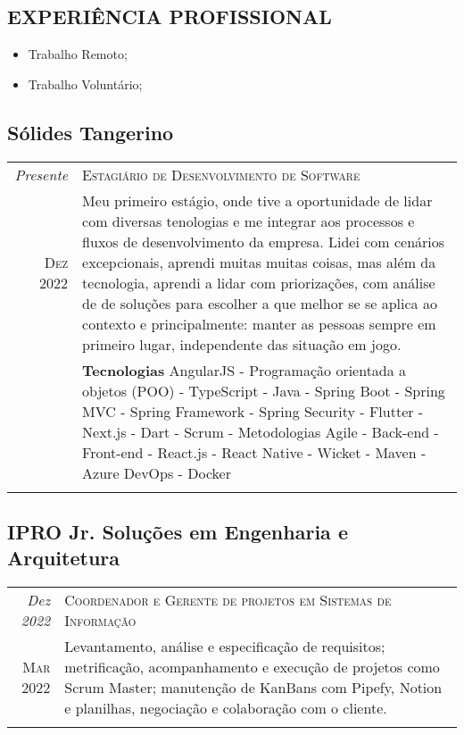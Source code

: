 \begin{framed}
\section{EXPERIÊNCIA PROFISSIONAL}
\begin{itemize}
  \item Trabalho Remoto;
  \item Trabalho Voluntário;

\end{itemize}

\subsection{  Sólides Tangerino}

\begin{tabular}{r|p{6cm}}
\emph{Presente}   & \textsc{Estagiário de Desenvolvimento de Software} \\
\textsc{Dez 2022} & \footnotesize{Meu primeiro estágio, onde tive a oportunidade de lidar com diversas tenologias e me integrar aos processos e fluxos de desenvolvimento da empresa. Lidei com cenários excepcionais, aprendi muitas muitas coisas, mas além da tecnologia, aprendi a lidar com priorizações, com análise de de soluções para escolher a que melhor se se aplica ao contexto e principalmente: manter as pessoas sempre em primeiro lugar, independente das situação em jogo.}\\
  & \footnotesize{
 \textbf{Tecnologias} 
 AngularJS - Programação orientada a objetos (POO) - TypeScript - Java - Spring Boot - Spring MVC - Spring Framework - Spring Security - Flutter - Next.js - Dart - Scrum - Metodologias Agile - Back-end - Front-end - React.js - React Native - Wicket - Maven - Azure DevOps - Docker}\\
\multicolumn{2}{c}{}
\end{tabular}


\subsection{  IPRO Jr. Soluções em Engenharia e Arquitetura}

\begin{tabular}{r|p{6cm}}
\emph{Dez 2022}   & \textsc{Coordenador e Gerente de projetos em Sistemas de Informação }\\
\textsc{Mar 2022} & \footnotesize{Levantamento, análise e especificação de requisitos; metrificação, acompanhamento e execução de projetos como Scrum Master; manutenção de KanBans com Pipefy, Notion e planilhas, negociação e colaboração com o cliente.}\\
\multicolumn{2}{c}{}\\


\end{tabular}
\end{framed}
